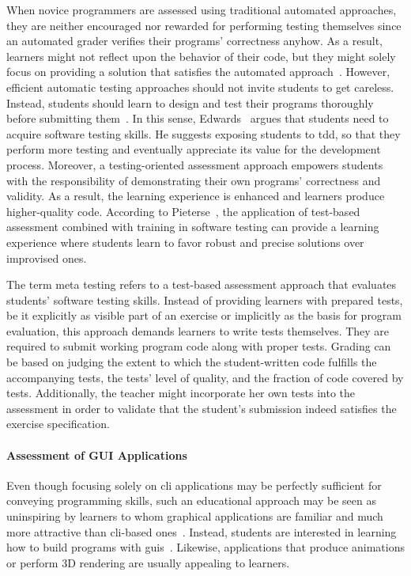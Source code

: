 When novice programmers are assessed using traditional automated approaches, they are neither encouraged nor rewarded for performing testing themselves since an automated grader verifies their programs' correctness anyhow. As a result, learners might not reflect upon the behavior of their code, but they might solely focus on providing a solution that satisfies the automated approach~\cite{edwards2003improving}. However, efficient automatic testing approaches should not invite students to get careless. Instead, students should learn to design and test their programs thoroughly before submitting them~\cite{ala2005survey}. In this sense, Edwards~\cite{edwards2003improving} argues that students need to acquire software testing skills. He suggests exposing students to \gls{tdd}, so that they perform more testing and eventually appreciate its value for the development process. Moreover, a testing-oriented assessment approach empowers students with the responsibility of demonstrating their own programs' correctness and validity. As a result, the learning experience is enhanced and learners produce higher-quality code. According to Pieterse~\cite{pieterse2013automated}, the application of test-based assessment combined with training in software testing can provide a learning experience where students learn to favor robust and precise solutions over improvised ones.

The term meta testing refers to a test-based assessment approach that evaluates students' software testing skills. Instead of providing learners with prepared tests, be it explicitly as visible part of an exercise or implicitly as the basis for program evaluation, this approach demands learners to write tests themselves. They are required to submit working program code along with proper tests. Grading can be based on judging the extent to which the student-written code fulfills the accompanying tests, the tests' level of quality, and the fraction of code covered by tests. Additionally, the teacher might incorporate her own tests into the assessment in order to validate that the student's submission indeed satisfies the exercise specification.

\paragraph{Assessment of GUI Applications}

Even though focusing solely on \gls{cli} applications may be perfectly sufficient for conveying programming skills, such an educational approach may be seen as uninspiring by learners to whom graphical applications are familiar and much more attractive than \gls{cli}-based ones~\cite{douce2005automatic}. Instead, students are interested in learning how to build programs with \glspl{gui}~\cite{english2004automated}. Likewise, applications that produce animations or perform 3D rendering are usually appealing to learners.

